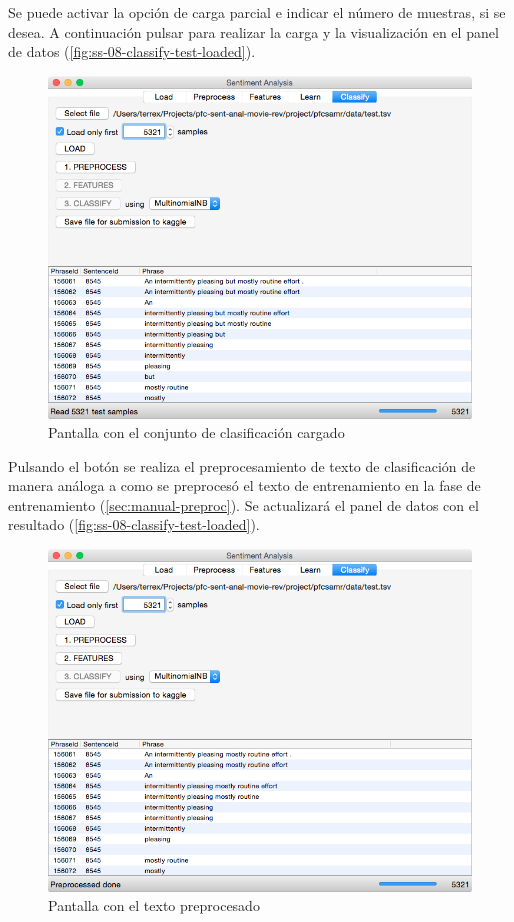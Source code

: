\newpage
Se puede activar la opción de carga parcial e indicar el número de muestras, si se desea. A continuación pulsar  para realizar la carga y la visualización en el panel de datos (\autoref{fig:ss-08-classify-test-loaded}).

\begin{figure}[H]
\centering
\includegraphics[width=14cm]{ss-08-classify-test-loaded}
\caption{Pantalla con el conjunto de clasificación cargado}
\label{fig:ss-08-classify-test-loaded}
\end{figure}

\newpage
Pulsando el botón  se realiza el preprocesamiento de texto de clasificación de manera análoga a como se preprocesó el texto de entrenamiento en la fase de entrenamiento (\autoref{sec:manual-preproc}). Se actualizará el panel de datos con el resultado (\autoref{fig:ss-08-classify-test-loaded}).

\begin{figure}[H]
\centering
\includegraphics[width=14cm]{ss-09-classify-test-preproccesed}
\caption{Pantalla con el texto preprocesado}
\label{fig:ss-09-classify-test-preproccesed}
\end{figure}

